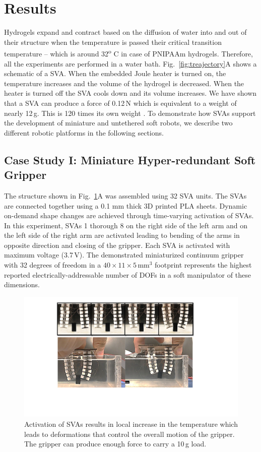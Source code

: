 \section{Results}
Hydrogels expand and contract based on the diffusion of water into and out of their structure when the temperature is passed their critical transition temperature -- which is around 32\textsuperscript{o} C in case of PNIPAAm hydrogels. Therefore, all the experiments are performed in a water bath. Fig.~\ref{fig:treajectory}A shows a schematic of a SVA. When the embedded Joule heater is turned on, the temperature increases and the volume of the hydrogel is decreased. When the heater is turned off the SVA cools down and its volume increases. We have shown that a SVA can produce a force of 0.12\,N which is equivalent to a weight of nearly 12\,g. This is 120 times its own weight \cite{Khodambashi2021}. To demonstrate how SVAs support the development of miniature and untethered soft robots, we describe two different robotic platforms in the following sections. 

\subsection{Case Study I: Miniature Hyper-redundant Soft Gripper}
The structure shown in Fig.~\ref{fig:gripper}A was assembled using 32 SVA units. The SVAs are connected together using a 0.1 mm thick 3D printed PLA sheets. Dynamic on-demand shape changes are achieved through time-varying activation of SVAs. In this experiment, SVAs 1 thorough 8 on the right side of the left arm and on the left side of the right arm are activated leading to bending of the arms in opposite direction and closing of the gripper.
Each SVA is activated with maximum voltage (3.7\,V). The demonstrated miniaturized continuum gripper with 32 degrees of freedom in a $40\times11\times5$\,mm$^3$ footprint represents the highest reported electrically-addressable number of DOFs in a soft manipulator of these dimensions. 
\begin{figure}[!ht]
      \centering
      \includegraphics[width=\textwidth]{gripper.pdf}
      \caption[Hyper-redundant gripper]{Activation of SVAs results in local increase in the temperature which leads to deformations that control the overall motion of the gripper. The gripper can produce enough force to carry a 10\,g load. }
      \label{fig:gripper}
\end{figure}

